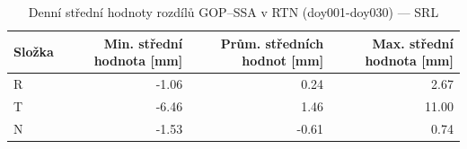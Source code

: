 \begin{table}[H]
\centering
\caption{Denní střední hodnoty rozdílů GOP–SSA v RTN (doy001-doy030) — SRL}
\label{tab:sa_ZAZG_doy001-doy030_mean}
\begin{tabular}{lrrr}
\toprule
Složka & Min. střední hodnota [mm] & Prům. středních hodnot [mm] & Max. střední hodnota [mm] \\
\midrule
R & -1.06 & 0.24 & 2.67 \\
T & -6.46 & 1.46 & 11.00 \\
N & -1.53 & -0.61 & 0.74 \\
\bottomrule
\end{tabular}
\end{table}

